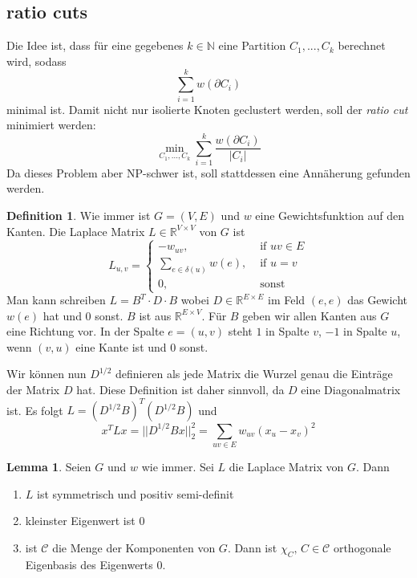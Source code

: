 \documentclass[a4paper, 12pt]{article}
\theoremstyle{plain}
\theoremstyle{definition}
\newtheorem{definition}[theorem]{Definition} %
\theoremstyle{lemma}
\newtheorem{lemma}[theorem]{Lemma}
\theoremstyle{remark}
\theoremstyle{corollary}
\theoremstyle{example}
\begin{document}
	\subsection{ratio cuts}
	Die Idee ist, dass für eine gegebenes $k \in \mathbb{N}$ eine Partition $C_1,...,C_k$ berechnet wird, sodass \[\sum_{i=1}^{k} w(\partial C_i)\] minimal ist. Damit nicht nur isolierte Knoten geclustert werden, soll der \textit{ratio cut} minimiert werden: \[\min_{C_1,...,C_k} \sum_{i=1}^k \frac{w(\partial C_i)}{\left|C_i\right|}\] Da dieses Problem aber NP-schwer ist, soll stattdessen eine Annäherung gefunden werden.
	\begin{definition}
		Wie immer ist $G=(V,E)$ und $w$ eine Gewichtsfunktion auf den Kanten. Die Laplace Matrix $L \in \mathbb{R}^{V\times V}$ von $G$ ist \[L_{u,v} = \begin{cases}
			-w_{uv}, & \text{ if } uv \in E\\
			\sum_{e \in \delta(u)} w(e), & \text{ if } u=v\\
			0, & \text{ sonst}
		\end{cases}\]
		Man kann schreiben $L = B^T\cdot D \cdot B$ wobei $D \in \mathbb{R}^{E \times E}$ im Feld $(e,e)$ das Gewicht $w(e)$ hat und 0 sonst. $B$ ist aus $\mathbb{R}^{E \times V}$. Für $B$ geben wir allen Kanten aus $G$ eine Richtung vor. In der Spalte $e = (u,v)$ steht $1$ in Spalte $v$, $-1$ in Spalte $u$, wenn $(v,u)$ eine Kante ist und 0 sonst.
	\end{definition}
	Wir können nun $D^{1/2}$ definieren als jede Matrix die Wurzel genau die Einträge der Matrix $D$ hat. Diese Definition ist daher sinnvoll, da $D$ eine Diagonalmatrix ist. Es folgt $L = (D^{1/2}B)^T(D^{1/2}B)$ und \[x^T L x = ||D^{1/2}Bx||_2^2 = \sum_{uv \in E} w_{uv}(x_u-x_v)^2\]
	\begin{lemma}
		Seien $G$ und $w$ wie immer. Sei $L$ die Laplace Matrix von $G$. Dann \begin{enumerate}
			\item $L$ ist symmetrisch und positiv semi-definit
			\item kleinster Eigenwert ist 0
			\item ist $\mathcal{C}$ die Menge der Komponenten von $G$. Dann ist $\chi_C, \, C \in \mathcal{C}$ orthogonale Eigenbasis des Eigenwerts 0.
		\end{enumerate}
	\end{lemma}
\end{document}
